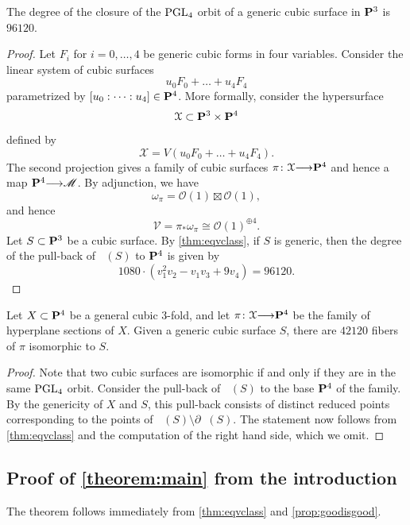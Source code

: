 \documentclass[12pt,reqno]{amsart}
\DeclareMathOperator{\Orb}{\overline{Orb}}
\renewcommand{\to}{{\longrightarrow}}
\numberwithin{equation}{section}
\renewcommand{\O}{\mathcal O}
\begin{document}
\begin{corollary}
  The degree of the closure of the $\PGL_4$ orbit of a generic cubic surface in $\P^3$ is $96120$.
\end{corollary}
\begin{proof}
  Let $F_i$ for $i = 0,\dots,4$ be generic cubic forms in four variables.
  Consider the linear system of cubic surfaces
  \[ u_0F_0 + \dots + u_4F_4\]
  parametrized by $[u_0:\dots:u_4] \in \P^4$.
  More formally, consider the hypersurface
  \[ \mathcal X \subset \P^3 \times \P^4\]
  defined by
  \[ \mathcal X = V(u_0F_0 + \dots + u_4F_4).\]
  The second projection gives a family of cubic surfaces $\pi \colon \mathcal X \to \P^4$ and hence a map $\P^4 \to \mathscr M$.
  By adjunction, we have
  \[ \omega_\pi = \O(1) \boxtimes \O(1),\]
  and hence
  \[ \mathcal V = \pi_* \omega_\pi \cong \O(1)^{\oplus 4}.\]
  Let $S \subset \P^3$ be a cubic surface.
  By \autoref{thm:eqvclass}, if $S$ is generic, then the degree of the pull-back of $\Orb(S)$ to $\P^4$ is given by
  \[ 1080 \cdot \left(v_{1}^{2}v_{2} - v_{1}v_{3}+ 9v_{4}\right) = 96120.\]
\end{proof}

\begin{corollary}
  Let $X \subset \P^4$ be a general cubic 3-fold, and let $\pi \colon \mathcal X \to \P^4$ be the family of hyperplane sections of $X$.
  Given a generic cubic surface $S$, there are $42120$ fibers of $\pi$ isomorphic to $S$.
\end{corollary}
\begin{proof}
  Note that two cubic surfaces are isomorphic if and only if they are in the same $\PGL_4$ orbit.
  Consider the pull-back of $\Orb(S)$ to the base $\P^4$ of the family.
  By the genericity of $X$ and $S$, this pull-back consists of distinct reduced points corresponding to the points of $\Orb(S) \setminus \partial \Orb(S)$.
  The statement now follows from \autoref{thm:eqvclass} and the computation of the right hand side, which we omit.
\end{proof}

\subsection{Proof of \texorpdfstring{\autoref{theorem:main}}{first theorem} from the introduction}
The theorem follows immediately from \autoref{thm:eqvclass} and \autoref{prop:goodisgood}.
\end{document}
